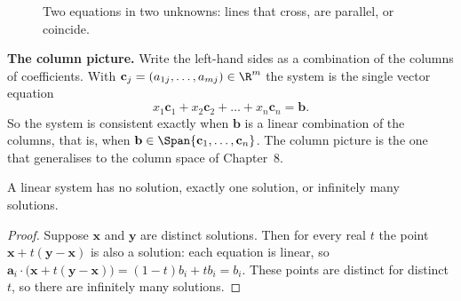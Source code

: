 \begin{figure}[h]
\centering
{}
\caption{Two equations in two unknowns: lines that cross, are parallel, or coincide.}
\end{figure}

\textbf{The column picture.} Write the left-hand sides as a combination of the columns of coefficients. With $\mathbf{c}_j=(a_{1j},\dots,a_{mj})\in\R^m$ the system is the single vector equation
\[ x_1\mathbf{c}_1+x_2\mathbf{c}_2+\dots+x_n\mathbf{c}_n=\mathbf{b}. \]
So the system is consistent exactly when $\mathbf{b}$ is a linear combination of the columns, that is, when $\mathbf{b}\in\Span\{\mathbf{c}_1,\dots,\mathbf{c}_n\}$. The column picture is the one that generalises to the column space of Chapter~8.

\begin{theorem}\label{thm:three}
A linear system has no solution, exactly one solution, or infinitely many solutions.
\end{theorem}

\begin{proof}
Suppose $\mathbf{x}$ and $\mathbf{y}$ are distinct solutions. Then for every real $t$ the point $\mathbf{x}+t(\mathbf{y}-\mathbf{x})$ is also a solution: each equation is linear, so $\mathbf{a}_i\cdot\big(\mathbf{x}+t(\mathbf{y}-\mathbf{x})\big)=(1-t)b_i+tb_i=b_i$. These points are distinct for distinct $t$, so there are infinitely many solutions.
\end{proof}

